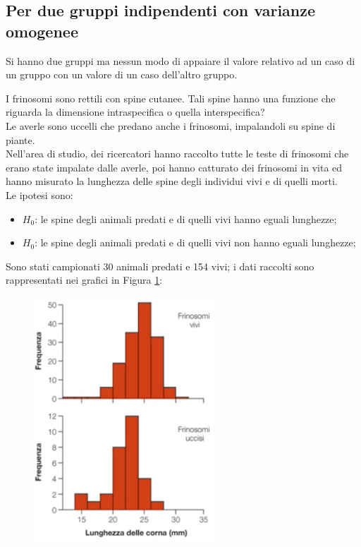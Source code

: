 \documentclass[10pt, draft]{book}
\newcommand{\tightlist}{%
\setlength{\itemsep}{1pt}\setlength{\parskip}{0pt}\setlength{\parsep}{0pt}}
\newcounter{example}[section]
\begin{document}
\subsection{Per due gruppi indipendenti con varianze omogenee}
Si hanno due gruppi ma nessun modo di appaiare il valore relativo ad un caso di un gruppo con un valore di un caso dell'altro gruppo.
\begin{example}\label{esfrinosomi}
    I frinosomi sono rettili con spine cutanee. Tali spine hanno una funzione che riguarda la dimensione intraspecifica o quella interspecifica?
    \\
    Le averle sono uccelli che predano anche i frinosomi, impalandoli su spine di piante.
    \\
    Nell'area di studio, dei ricercatori hanno raccolto tutte le teste di frinosomi che erano state impalate dalle averle, poi hanno catturato dei frinosomi in vita ed hanno misurato la lunghezza delle spine degli individui vivi e di quelli morti.
    \\
    Le ipotesi sono:
    \begin{itemize} \tightlist
        \item $H_0$: le spine degli animali predati e di quelli vivi hanno eguali lunghezze;
        \item $H_0$: le spine degli animali predati e di quelli vivi non hanno eguali lunghezze;
    \end{itemize}
    Sono stati campionati 30 animali predati e 154 vivi; i dati raccolti sono rappresentati nei grafici in Figura \ref{fig12.3-1}:
    \begin{figure}[H]\label{fig12.3-1}
        \centering
        \includegraphics[width=0.6\textwidth]{fig12.3-1}

\end{figure}
\end{example}
\end{document}
